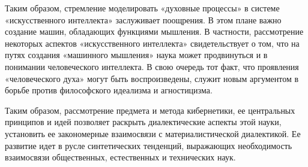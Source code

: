 \documentclass[14pt]{extarticle}
\begin{document}
Таким образом, стремление моделировать «духовные процессы» в системе «искусственного интеллекта» заслуживает поощрения. В этом плане важно создание машин, обладающих функциями мышления. В частности, рассмотрение некоторых аспектов «искусственного интеллекта» свидетельствует о том, что на путях создания «машинного мышления» наука может продвинуться и в понимании человеческого интеллекта. В свою очередь тот факт, что проявления «человеческого духа» могут быть воспроизведены, служит новым аргументом в борьбе против философского идеализма и агностицизма.

Таким образом, рассмотрение предмета и метода кибернетики, ее центральных принципов и идей позволяет раскрыть диалектические аспекты этой науки, установить ее закономерные взаимосвязи с материалистической диалектикой. Ее развитие идет в русле синтетических тенденций, выражающих необходимость взаимосвязи общественных, естественных и технических наук.
\end{document}
